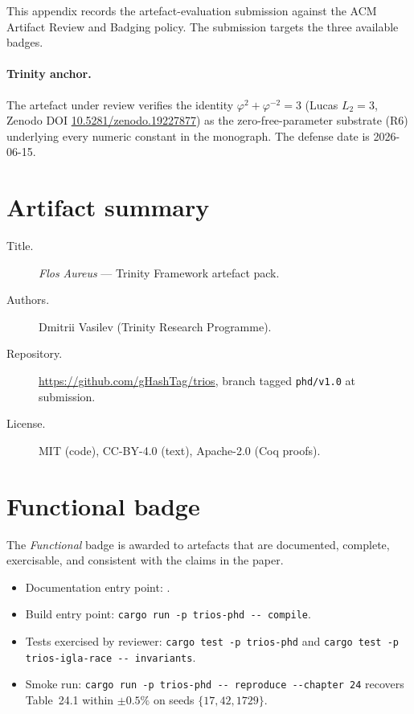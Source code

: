 This appendix records the artefact-evaluation submission against the
ACM Artifact Review and Badging policy. The submission targets the
three available badges.

\paragraph{Trinity anchor.} The artefact under review verifies the identity
\(\varphi^{2} + \varphi^{-2} = 3\) (Lucas \(L_{2} = 3\), Zenodo DOI
\href{https://doi.org/10.5281/zenodo.19227877}{10.5281/zenodo.19227877}) as the
zero-free-parameter substrate (R6) underlying every numeric constant in the
monograph. The defense date is 2026-06-15.

\section{Artifact summary}

\begin{description}
  \item[Title.] \emph{Flos Aureus} — Trinity Framework artefact pack.
  \item[Authors.] Dmitrii Vasilev (Trinity Research Programme).
  \item[Repository.] \url{https://github.com/gHashTag/trios}, branch
        tagged \verb|phd/v1.0| at submission.
  \item[License.] MIT (code), CC-BY-4.0 (text), Apache-2.0 (Coq proofs).
\end{description}

\section{Functional badge}

The \emph{Functional} badge is awarded to artefacts that are
documented, complete, exercisable, and consistent with the claims in
the paper.

\begin{itemize}
  \item Documentation entry point: .
  \item Build entry point: \verb|cargo run -p trios-phd -- compile|.
  \item Tests exercised by reviewer: \verb|cargo test -p trios-phd|
        and \verb|cargo test -p trios-igla-race -- invariants|.
  \item Smoke run: \verb|cargo run -p trios-phd -- reproduce --chapter 24|
        recovers Table~24.1 within \(\pm 0.5\%\) on seeds
        \(\{17, 42, 1729\}\).
\end{itemize}

